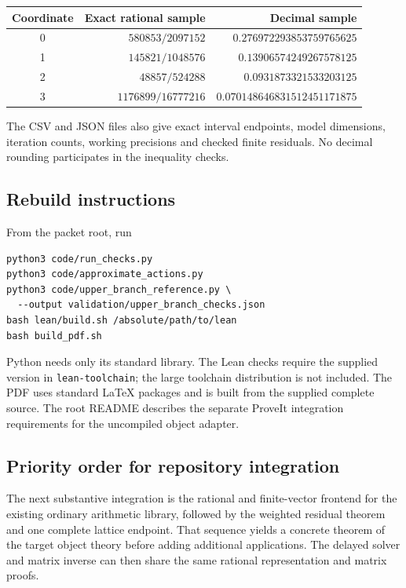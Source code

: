 \begin{center}
\begin{tabular}{crr}
\toprule
Coordinate & Exact rational sample & Decimal sample\\
\midrule
0 & \(580853/2097152\) & \(0.276972293853759765625\)\\
1 & \(145821/1048576\) & \(0.13906574249267578125\)\\
2 & \(48857/524288\) & \(0.0931873321533203125\)\\
3 & \(1176899/16777216\) & \(0.070148646831512451171875\)\\
\bottomrule
\end{tabular}
\end{center}

The CSV and JSON files also give exact interval endpoints, model
dimensions, iteration counts, working precisions and checked
finite residuals. No decimal rounding participates in the
inequality checks.

\subsection{Rebuild instructions}

From the packet root, run
\begin{lstlisting}
python3 code/run_checks.py
python3 code/approximate_actions.py
python3 code/upper_branch_reference.py \
  --output validation/upper_branch_checks.json
bash lean/build.sh /absolute/path/to/lean
bash build_pdf.sh
\end{lstlisting}
Python needs only its standard library. The Lean checks require
the supplied version in \texttt{lean-toolchain}; the large
toolchain distribution is not included. The PDF uses standard
LaTeX packages and is built from the supplied complete source.
The root README describes the separate ProveIt integration
requirements for the uncompiled object adapter.

\subsection{Priority order for repository integration}

The next substantive integration is the rational and finite-vector
frontend for the existing ordinary arithmetic library, followed
by the weighted residual theorem and one complete lattice
endpoint. That sequence yields a concrete theorem of the target
object theory before adding additional applications. The delayed
solver and matrix inverse can then share the same rational
representation and matrix proofs.

